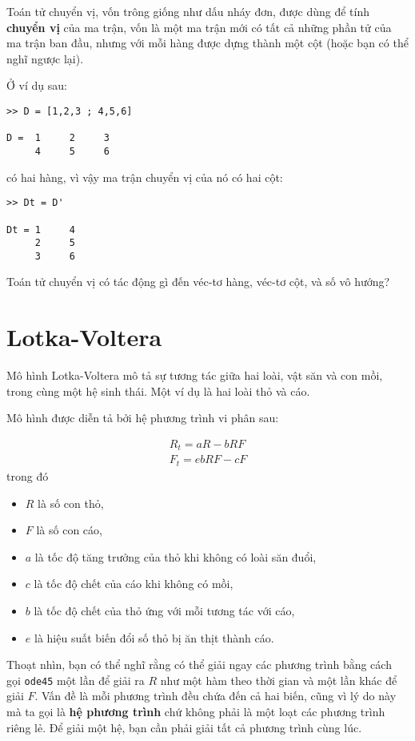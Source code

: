 \documentclass[12pt]{book}
\begin{document}
Toán tử chuyển vị, vốn trông giống như dấu nháy đơn, được dùng để
tính {\bf chuyển vị} của ma trận, vốn là một ma trận mới có tất cả
những phần tử của ma trận ban đầu, nhưng với mỗi hàng được
dựng thành một cột (hoặc bạn có thể nghĩ ngược lại).

Ở ví dụ sau:

\begin{verbatim}
>> D = [1,2,3 ; 4,5,6]

D =  1     2     3
     4     5     6
\end{verbatim}
%
 có hai hàng, vì vậy ma trận chuyển vị của nó có
hai cột:

\begin{verbatim}
>> Dt = D'

Dt = 1     4
     2     5
     3     6
\end{verbatim}
%
\begin{ex}
Toán tử chuyển vị có tác động gì đến véc-tơ hàng, véc-tơ cột, và
số vô hướng?
\end{ex}


\section{Lotka-Voltera}
\label{lotka}

Mô hình Lotka-Voltera mô tả sự tương tác giữa hai loài, vật săn và con
mồi, trong cùng một hệ sinh thái. Một ví dụ là hai loài thỏ và cáo.

Mô hình được diễn tả bởi hệ phương trình vi phân sau:

\begin{eqnarray*}
R_t = a R - b R F \\
F_t = e b R F - c F
\end{eqnarray*}
%
\noindent trong đó
%
\begin{itemize}
%
\item $R$ là số con thỏ,
\item $F$ là số con cáo,
\item $a$ là tốc độ tăng trưởng của thỏ khi không có loài săn đuổi,
\item $c$ là tốc độ chết của cáo khi không có mồi,
\item $b$ là tốc độ chết của thỏ ứng với mỗi tương tác với cáo,
\item $e$ là hiệu suất biến đổi số thỏ bị ăn thịt thành cáo.
%
\end{itemize}

Thoạt nhìn, bạn có thể nghĩ rằng có thể giải ngay các phương trình
bằng cách gọi {\tt ode45} một lần để giải ra $R$ như một hàm theo
thời gian và một lần khác để giải $F$. Vấn đề là mỗi phương trình
đều chứa đến cả hai biến, cũng vì lý do này mà ta gọi là  
{\bf hệ phương trình} chứ không phải là một loạt các phương trình
riêng lẻ. Để giải một hệ, bạn cần phải giải tất cả phương trình
cùng lúc.
\end{document}
